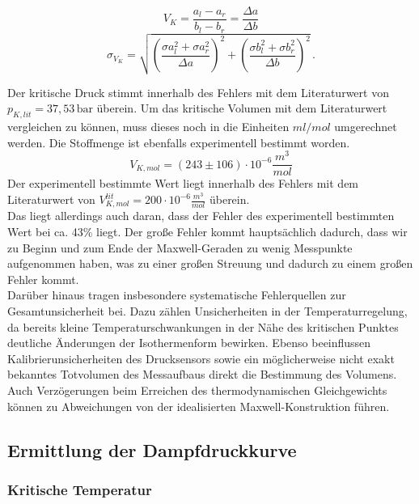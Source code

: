 \begin{equation}
    V_K = \frac{a_l - a_r}{b_l - b_r} = \frac{\Delta a}{\Delta b}
\end{equation}
\begin{equation}
\sigma_{V_K}
    = \sqrt{\left(\frac{\sigma a_l^{2} + \sigma a_r^{2}}{\Delta a}\right)^{2}
           + \left(\frac{\sigma b_l^{2} + \sigma b_r^{2}}{\Delta b}\right)^{2}}\,.
\end{equation}

    Der kritische Druck stimmt innerhalb des Fehlers mit dem Literaturwert von \(p_{K,lit} = 37,53 \, \text{bar}\) \cite{SF6LITERATUR} überein.
    Um das kritische Volumen mit dem Literaturwert vergleichen zu können, muss dieses noch in die Einheiten \(ml/mol\) umgerechnet werden.
    Die Stoffmenge ist ebenfalls experimentell bestimmt worden.
    \begin{equation}
        V_{K,mol} = (243 \pm 106) \cdot 10^{-6} \frac{m^3}{mol}
    \end{equation}
    Der experimentell bestimmte Wert liegt innerhalb des Fehlers mit dem Literaturwert von $V_{K,mol}^{lit} = 200 \cdot 10^{-6} \frac{m^3}{mol}$ \cite{SF6LITERATUR} überein. \\
    Das liegt allerdings auch daran, dass der Fehler des experimentell bestimmten Wert bei ca. 43\% liegt. Der große Fehler kommt hauptsächlich dadurch, dass wir zu Beginn und zum Ende der Maxwell-Geraden
    zu wenig Messpunkte aufgenommen haben, was zu einer großen Streuung und dadurch zu einem großen Fehler kommt.\\
    Darüber hinaus tragen insbesondere systematische Fehlerquellen zur
Gesamtunsicherheit bei. Dazu zählen Unsicherheiten in der
Temperaturregelung, da bereits kleine Temperaturschwankungen in der
Nähe des kritischen Punktes deutliche Änderungen der Isothermenform
bewirken. Ebenso beeinflussen Kalibrierunsicherheiten des
Drucksensors sowie ein möglicherweise nicht exakt bekanntes
Totvolumen des Messaufbaus direkt die Bestimmung des Volumens.
Auch Verzögerungen beim Erreichen des thermodynamischen
Gleichgewichts können zu Abweichungen von der idealisierten
Maxwell-Konstruktion führen.

    \subsection{Ermittlung der Dampfdruckkurve}

    \subsubsection{Kritische Temperatur}

